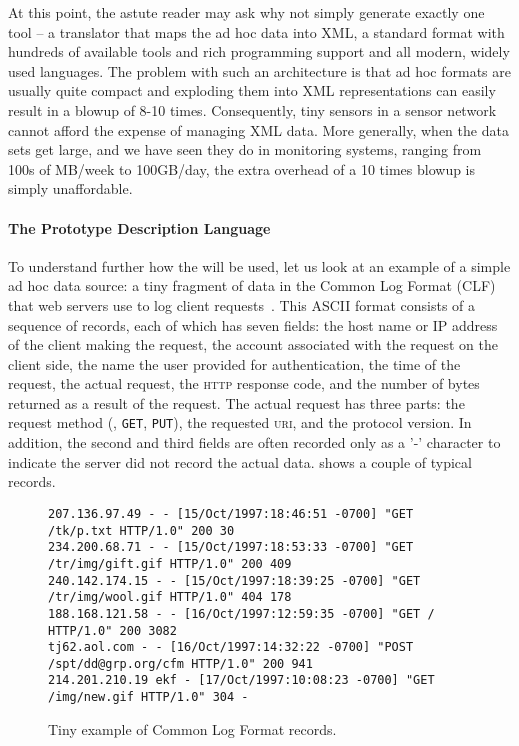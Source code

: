 \documentclass[10pt]{article}
\begin{document}
At this point, the astute reader may ask why not simply generate
exactly one tool -- a translator that maps the ad hoc data into
XML, a standard format with hundreds of available tools and
rich programming support and all modern, widely used languages.
The problem with such an architecture is that ad hoc formats
are usually quite compact and exploding them into XML representations
can easily result in a blowup of 8-10 times.  Consequently, tiny
sensors in a sensor network cannot afford the expense of managing
XML data.  More generally, when the data sets get large, and we 
have seen they do in monitoring systems, 
ranging from 100s of MB/week to 100GB/day,
the extra overhead of a 10 times blowup is simply unaffordable.

\paragraph*{The Prototype Description Language}
To understand further how the \pads{} will be used,
let us look at an example of a simple ad hoc data source:
a tiny fragment of data in the Common Log Format (CLF) that web
servers use to log client requests~\cite{wpp}.  
This ASCII format consists of a sequence of
records, each of which has seven fields: the host name or IP address
of the client making the request, the account associated with the
request on the client side, the name the user provided for
authentication, the time of the request, the actual request, the
\textsc{http} response code, and the number of bytes returned as a
result of the request.  The actual request has three parts: the
request method (\eg, \texttt{GET}, \texttt{PUT}), the requested
\textsc{uri}, and the protocol version.  In addition, the second and
third fields are often recorded only as a '-' character to indicate
the server did not record the actual data.  
shows a couple of typical records.



\begin{figure*}
\begin{footnotesize}
\begin{verbatim}
207.136.97.49 - - [15/Oct/1997:18:46:51 -0700] "GET /tk/p.txt HTTP/1.0" 200 30
234.200.68.71 - - [15/Oct/1997:18:53:33 -0700] "GET /tr/img/gift.gif HTTP/1.0" 200 409
240.142.174.15 - - [15/Oct/1997:18:39:25 -0700] "GET /tr/img/wool.gif HTTP/1.0" 404 178
188.168.121.58 - - [16/Oct/1997:12:59:35 -0700] "GET / HTTP/1.0" 200 3082
tj62.aol.com - - [16/Oct/1997:14:32:22 -0700] "POST /spt/dd@grp.org/cfm HTTP/1.0" 200 941
214.201.210.19 ekf - [17/Oct/1997:10:08:23 -0700] "GET /img/new.gif HTTP/1.0" 304 -
\end{verbatim}
\caption{Tiny example of Common Log Format records. }
\label{figure:clf-records}
\end{footnotesize}
\end{figure*}
\end{document}
